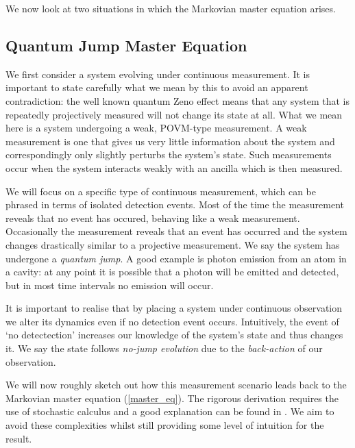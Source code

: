 We now look at two situations in which the Markovian master equation arises.

\subsection{Quantum Jump Master Equation}

We first consider a system evolving under continuous measurement. It is important to state carefully what we mean by this to avoid an apparent contradiction: the well known quantum Zeno effect means that any system that is repeatedly projectively measured will not change its state at all. What we mean here is a system undergoing a weak, POVM-type measurement. A weak measurement is one that gives us very little information about the system and correspondingly only slightly perturbs the system's state. Such measurements occur when the system interacts weakly with an ancilla which is then measured.

We will focus on a specific type of continuous measurement, which can be phrased in terms of isolated detection events. Most of the time the measurement reveals that no event has occured, behaving like a weak measurement. Occasionally the measurement reveals that an event has occurred and the system changes drastically similar to a projective measurement. We say the system has undergone a \textit{quantum jump}. A good example is photon emission from an atom in a cavity: at any point it is possible that a photon will be emitted and detected, but in most time intervals no emission will occur.

It is important to realise that by placing a system under continuous observation we alter its dynamics even if no detection event occurs. Intuitively, the event of `no detectection' increases our knowledge of the system's state and thus changes it. We say the state follows \textit{no-jump evolution} due to the \textit{back-action} of our observation.

We will now roughly sketch out how this measurement scenario leads back to the Markovian master equation (\ref{master_eq}). The rigorous derivation requires the use of stochastic calculus and a good explanation can be found in \cite{brun}. We aim to avoid these complexities whilst still providing some level of intuition for the result. 

